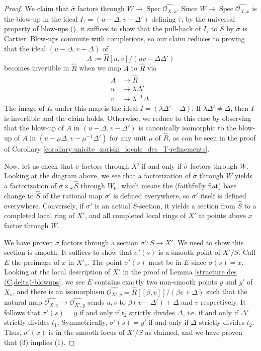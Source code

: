 \documentclass[a4paper,10pt,twoside]{article}
\newcommand{\ra}{\rightarrow}
\renewcommand{\O}{\mathcal{O}}
\DeclareMathOperator{\spec}{Spec}
\theoremstyle{definition}
\theoremstyle{remark}
\begin{document}
\begin{proof}
		We claim that $\widehat{\sigma}$ factors through $W\to\spec\widehat{\O_{X,x}}$. Since $W\to\spec\widehat{\O_{X,x}}$ is the blow-up in the ideal $I_{\widehat{\tau}}=(u-\Delta,v-\Delta')$ defining $\widehat{\tau}$, by the universal property of blow-ups (\cite[\href{https://stacks.math.columbia.edu/tag/085U}{Tag 085U}]{stacks-project}), it suffices to show that the pull-back of $I_{\widehat{\tau}}$ to $\widehat{S}$ by $\widehat{\sigma}$ is Cartier. Blow-ups commute with completions, so our claim reduces to proving that the ideal $(u-\Delta,v-\Delta)$ of
		\[
		A:=\widehat{R}[u,v]/(uv-\Delta\Delta')
		\]
		becomes invertible in $\widehat{R}$ when we map $A$ to $\widehat{R}$ via
		\begin{align*}
		A & \to \widehat{R} \\
		u & \mapsto \lambda\Delta' \\
		v & \mapsto \lambda^{-1}\Delta.
		\end{align*}
		The image of $I_{\widehat{\tau}}$ under this map is the ideal $I=(\lambda\Delta'-\Delta)$. If $\lambda\Delta'\neq\Delta$, then $I$ is invertible and the claim holds. Otherwise, we reduce to this case by observing that the blow-up of $A$ in $(u-\Delta,v-\Delta')$ is canonically isomorphic to the blow-up of $A$ in $(u-\mu\Delta,v-\mu^{-1}\Delta')$ for any unit $\mu$ of $\widehat{R}$, as can be seen in the proof of Corollary \ref{corollary:unicite_zariski_locale_des_T-refinements}.
		
		Now, let us check that $\sigma$ factors through $X'$ if and only if $\widehat{\sigma}$ factors through $W$. Looking at the diagram above, we see that a factorization of $\widehat{\sigma}$ through $W$ yields a factorization of $\sigma\times_S\widehat{S}$ through $W_0$, which means the (faithfully flat) base change to $\widehat{S}$ of the rational map $\sigma'$ is defined everywhere, so $\sigma'$ itself is defined everywhere. Conversely, if $\sigma'$ is an actual $S$-section, it yields a section from $\widehat{S}$ to a completed local ring of $X'$, and all completed local rings of $X'$ at points above $x$ factor through $W$.
		
		We have proven $\sigma$ factors through a section $\sigma'\colon S\to X'$. We need to show this section is smooth. It suffices to show that $\sigma'(s)$ is a smooth point of $X'/S$. Call $E$ the preimage of $x$ in $X'_s$. The point $\sigma'(s)$ must be in $E$ since $\sigma(s)=x$. Looking at the local description of $X'$ in the proof of Lemma \ref{structure des (C,delta)-blowups}, we see $E$ contains exactly two non-smooth points $y$ and $y'$ of $X_s$, and there is an isomorphism $\widehat{\O_{X',y}}=\widehat{R}[[\beta,v]]/(\beta v+\Delta)$ such that the natural map $\widehat{\O_{X,x}}\ra\widehat{\O_{X',y}}$ sends $u,v$ to $\beta(v-\Delta')+\Delta$ and $v$ respectively. It follows that $\sigma'(s)=y$ if and only if $t_2$ strictly divides $\Delta$, i.e. if and only if $\Delta'$ strictly divides $t_1$. Symmetrically, $\sigma'(s)=y'$ if and only if $\Delta$ strictly divides $t_2$. Thus, $\sigma'(x)$ is in the smooth locus of $X'/S$ as claimed, and we have proven that (3) implies (1).
		

\end{proof}
\end{document}
